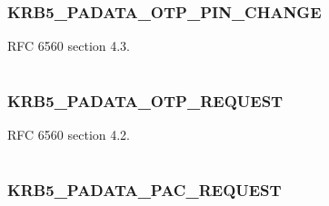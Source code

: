 \documentclass[letterpaper,10pt,english]{sphinxmanual}
\begin{document}
\subsubsection{KRB5\_PADATA\_OTP\_PIN\_CHANGE}
\label{appdev/refs/macros/KRB5_PADATA_OTP_PIN_CHANGE::doc}\label{appdev/refs/macros/KRB5_PADATA_OTP_PIN_CHANGE:krb5-padata-otp-pin-change}\label{appdev/refs/macros/KRB5_PADATA_OTP_PIN_CHANGE:krb5-padata-otp-pin-change-data}

\begin{fulllineitems}
\label{appdev/refs/macros/KRB5_PADATA_OTP_PIN_CHANGE:KRB5_PADATA_OTP_PIN_CHANGE}
\end{fulllineitems}


RFC 6560 section 4.3.

\begin{tabulary}{\linewidth}{|L|L|}
\hline

 & 
\\
\hline\end{tabulary}



\subsubsection{KRB5\_PADATA\_OTP\_REQUEST}
\label{appdev/refs/macros/KRB5_PADATA_OTP_REQUEST:krb5-padata-otp-request}\label{appdev/refs/macros/KRB5_PADATA_OTP_REQUEST::doc}\label{appdev/refs/macros/KRB5_PADATA_OTP_REQUEST:krb5-padata-otp-request-data}

\begin{fulllineitems}
\label{appdev/refs/macros/KRB5_PADATA_OTP_REQUEST:KRB5_PADATA_OTP_REQUEST}
\end{fulllineitems}


RFC 6560 section 4.2.

\begin{tabulary}{\linewidth}{|L|L|}
\hline

 & 
\\
\hline\end{tabulary}



\subsubsection{KRB5\_PADATA\_PAC\_REQUEST}
\label{appdev/refs/macros/KRB5_PADATA_PAC_REQUEST:krb5-padata-pac-request-data}\label{appdev/refs/macros/KRB5_PADATA_PAC_REQUEST:krb5-padata-pac-request}\label{appdev/refs/macros/KRB5_PADATA_PAC_REQUEST::doc}
\end{document}
